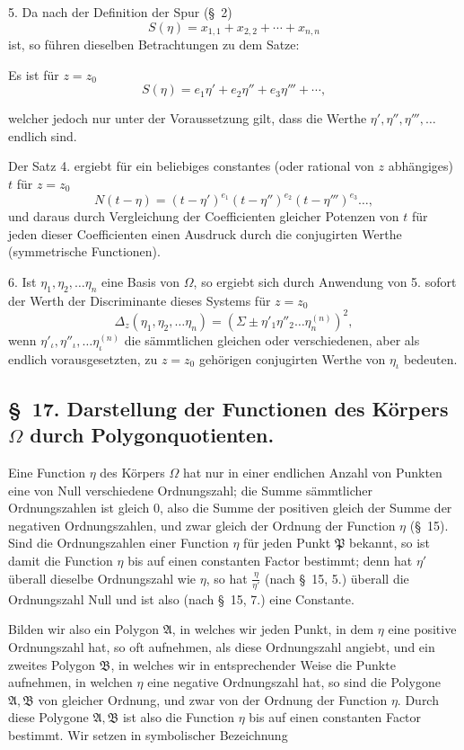 \documentclass{article}
\begin{document}
5. Da nach der Definition der Spur (§~2)
\[ S(\eta) = x_{1,1} + x_{2,2} + \cdots + x_{n,n} \]
ist, so führen dieselben Betrachtungen zu dem Satze:

Es ist für $z = z_{0}$
\[ S(\eta) = e_{1}\eta' + e_{2}\eta'' + e_{3}\eta''' + \cdots, \]

welcher jedoch nur unter der Voraussetzung gilt, dass die Werthe $\eta', \eta'', \eta''', \ldots$ endlich sind.

Der Satz 4. ergiebt für ein beliebiges constantes (oder rational von $z$ abhängiges) $t$ für $z = z_{0}$
\[ N(t-\eta) = (t-\eta')^{e_{1}}(t-\eta'')^{e_{2}}(t-\eta''')^{e_{3}}\ldots, \]
und daraus durch Vergleichung der Coefficienten gleicher Potenzen von $t$ für jeden dieser Coefficienten einen Ausdruck durch die conjugirten Werthe (symmetrische Functionen).

6. Ist $\eta_{1}, \eta_{2}, \ldots \eta_{n}$ eine Basis von $\Omega$, so ergiebt sich durch Anwendung von 5. sofort der Werth der Discriminante dieses Systems für $z = z_{0}$
\[ \Delta_{z}(\eta_{1}, \eta_{2}, \ldots \eta_{n}) = (\Sigma \pm \eta'_{1}\eta''_{2}\ldots\eta_{n}^{(n)})^{2}, \]
wenn $\eta'_{\iota}, \eta''_{\iota}, \ldots \eta_{\iota}^{(n)}$ die sämmtlichen gleichen oder verschiedenen, aber als endlich vorausgesetzten, zu $z = z_{0}$ gehörigen conjugirten Werthe von $\eta_{\iota}$ bedeuten.

\subsection*{§~17. Darstellung der Functionen des Körpers $\Omega$ durch Polygonquotienten.}

Eine Function $\eta$ des Körpers $\Omega$ hat nur in einer endlichen Anzahl von Punkten eine von Null verschiedene Ordnungszahl; die Summe sämmtlicher Ordnungszahlen ist gleich 0, also die Summe der positiven gleich der Summe der negativen Ordnungszahlen, und zwar gleich der Ordnung der Function $\eta$ (§~15). Sind die Ordnungszahlen einer Function $\eta$ für jeden Punkt $\mathfrak{P}$ bekannt, so ist damit die Function $\eta$ bis auf einen constanten Factor bestimmt; denn hat $\eta'$ überall dieselbe Ordnungszahl wie $\eta$, so hat $\frac{\eta}{\eta'}$ (nach §~15, 5.) überall die Ordnungszahl Null und ist also (nach §~15, 7.) eine Constante.

Bilden wir also ein Polygon $\mathfrak{A}$, in welches wir jeden Punkt, in dem $\eta$ eine positive Ordnungszahl hat, so oft aufnehmen, als diese Ordnungszahl angiebt, und ein zweites Polygon $\mathfrak{B}$, in welches wir in entsprechender Weise die Punkte aufnehmen, in welchen $\eta$ eine negative Ordnungszahl hat, so sind die Polygone $\mathfrak{A}, \mathfrak{B}$ von gleicher Ordnung, und zwar von der Ordnung der Function $\eta$. Durch diese Polygone $\mathfrak{A}, \mathfrak{B}$ ist also die Function $\eta$ bis auf einen constanten Factor bestimmt. Wir setzen in symbolischer Bezeichnung
\end{document}
